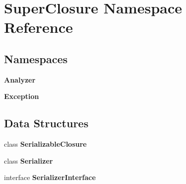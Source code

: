 \section{Super\+Closure Namespace Reference}
\label{namespace_super_closure}
\subsection*{Namespaces}
\begin{DoxyCompactItemize}
\item 
 {\bf Analyzer}
\item 
 {\bf Exception}
\end{DoxyCompactItemize}
\subsection*{Data Structures}
\begin{DoxyCompactItemize}
\item 
class {\bf Serializable\+Closure}
\item 
class {\bf Serializer}
\item 
interface {\bf Serializer\+Interface}
\end{DoxyCompactItemize}
